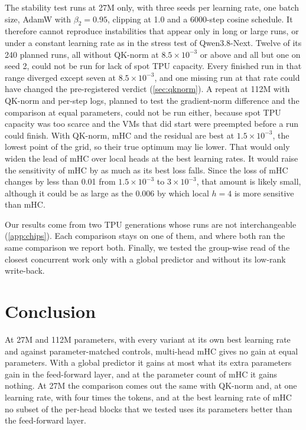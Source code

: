 \documentclass[11pt, a4paper]{article}
\newcommand{\lr}[1]{\ensuremath{#1 \times 10^{-3}}}
\begin{document}
The stability test runs at 27M only, with three seeds per learning rate, one batch size, AdamW with $\beta_2 = 0.95$, clipping at
1.0 and a 6000-step cosine schedule. It therefore cannot reproduce instabilities that appear only in long or large runs, or under a
constant learning rate as in the stress test of Qwen3.8-Next. Twelve of its 240 planned runs, all without QK-norm at \lr{8.5} or above and all but
one on seed 2, could not be run for lack of spot TPU capacity. Every finished run in that range diverged except seven at \lr{8.5}, and one missing run at that rate could have changed
the pre-registered verdict (\cref{sec:qknorm}). A repeat at 112M with QK-norm and
per-step logs, planned to test the gradient-norm difference and the comparison at equal parameters, could not be run either, because
spot TPU capacity was too scarce and the VMs that did start were preempted before a run could finish. With QK-norm, mHC and the
residual are best at \lr{1.5}, the lowest point of the grid, so their true optimum may lie lower. That would only widen the lead of
mHC over local heads at the best learning rates. It would raise the sensitivity of mHC by as much as its best loss falls. Since the loss of mHC changes by less than 0.01 from
\lr{1.5} to \lr{3}, that amount is likely small, although it could be as large as the 0.006 by which local $h = 4$ is more
sensitive than mHC.

Our results come from two TPU generations whose runs are not interchangeable (\cref{app:chips}). Each comparison stays on one of
them, and where both ran the same comparison we report both. Finally, we tested the group-wise read of the closest concurrent work
\citep{anon2026uhc} only with a global predictor and without its low-rank write-back.

\section{Conclusion}
\label{sec:conclusion}

At 27M and 112M parameters, with every variant at its own best learning rate and against parameter-matched controls, multi-head
mHC gives no gain at equal parameters. With a global predictor it gains at most what its extra parameters gain in the feed-forward
layer, and at the parameter count of mHC it gains nothing. At 27M the comparison comes out the same with QK-norm and, at one learning rate, with four times the tokens, and at the best learning rate of mHC no subset of the per-head blocks that we tested uses its parameters better
than the feed-forward layer.
\end{document}
